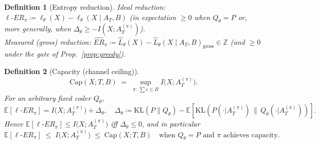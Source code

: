 \documentclass[12pt,a4paper]{article}
\newtheorem{definition}{Definition}
\newcommand{\ERideal}{\ell\text{-}ER}
\newcommand{\ERmeas}{\widehat{ER}}
\begin{document}
\begin{definition}[Entropy reduction]
\emph{Ideal} reduction: $\ERideal_\pi \coloneqq \ell_\theta(X)-\ell_\theta(X\mid A_T,B)$ (in expectation $\ge 0$ when $Q_\theta=P$ or, more generally, when $\Delta_\theta\ge -I(X;A_T^{(\pi)})$).\\
\emph{Measured (gross) reduction:} $\ERmeas_\pi \coloneqq \widehat{L}_\theta(X)-\widehat{L}_\theta(X\mid A_T,B)_{\mathrm{gross}}\in \mathbb{Z}$ (and $\ge 0$ under the gate of Prop.~\ref{prop:greedy}).
\end{definition}

\begin{definition}[Capacity (channel ceiling)]
\[
\mathrm{Cap}(X;T,B) \;=\; \sup_{\pi:\,\sum c\le B} I\!\big(X;A_T^{(\pi)}\big).
\]
For an arbitrary fixed coder $Q_\theta$,
\[
\mathbb{E}[\ERideal_\pi]
= I\!\big(X;A_T^{(\pi)}\big)
+\Delta_\theta,\quad
\Delta_\theta \coloneqq \mathrm{KL}(P\|Q_\theta)-\mathbb{E}\!\left[\mathrm{KL}\!\left(P(\cdot|A_T^{(\pi)})\,\|\,Q_\theta(\cdot|A_T^{(\pi)})\right)\right].
\]
Hence $\mathbb{E}[\ERideal_\pi]\le I\!\big(X;A_T^{(\pi)}\big)$ \emph{iff} $\Delta_\theta\le 0$, and in particular
\[
\mathbb{E}[\ERideal_\pi] \;\le\; I\!\big(X;A_T^{(\pi)}\big)\;\le\; \mathrm{Cap}(X;T,B)
\quad \text{when } Q_\theta=P \text{ and $\pi$ achieves capacity.}
\]
\end{definition}
\end{document}

